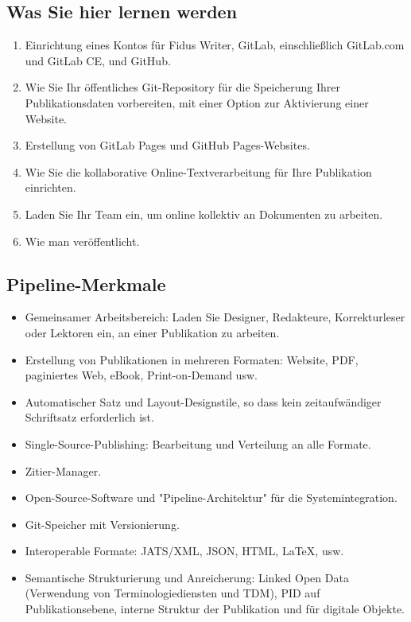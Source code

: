 \documentclass{article}
\begin{document}
\subsection{Was Sie hier lernen werden}\label{H7757657}


\begin{enumerate}
\item Einrichtung eines Kontos für Fidus Writer, GitLab, einschließlich GitLab.com und GitLab CE, und GitHub.


\item Wie Sie Ihr öffentliches Git-Repository für die Speicherung Ihrer Publikationsdaten vorbereiten, mit einer Option zur Aktivierung einer Website.


\item Erstellung von GitLab Pages und GitHub Pages-Websites.


\item Wie Sie die kollaborative Online-Textverarbeitung für Ihre Publikation einrichten.


\item Laden Sie Ihr Team ein, um online kollektiv an Dokumenten zu arbeiten.


\item Wie man veröffentlicht.


\end{enumerate}

\subsection{Pipeline-Merkmale}\label{H2087393}


\begin{itemize}
\item Gemeinsamer Arbeitsbereich: Laden Sie Designer, Redakteure, Korrekturleser oder Lektoren ein, an einer Publikation zu arbeiten.


\item Erstellung von Publikationen in mehreren Formaten: Website, PDF, paginiertes Web, eBook, Print-on-Demand usw.


\item Automatischer Satz und Layout-Designstile, so dass kein zeitaufwändiger Schriftsatz erforderlich ist.


\item Single-Source-Publishing: Bearbeitung und Verteilung an alle Formate.


\item Zitier-Manager.


\item Open-Source-Software und "Pipeline-Architektur" für die Systemintegration.


\item Git-Speicher mit Versionierung.


\item Interoperable Formate: JATS/XML, JSON, HTML, LaTeX, usw.


\item Semantische Strukturierung und Anreicherung: Linked Open Data (Verwendung von Terminologiediensten und TDM), PID auf Publikationsebene, interne Struktur der Publikation und für digitale Objekte.


\end{itemize}
\end{document}
